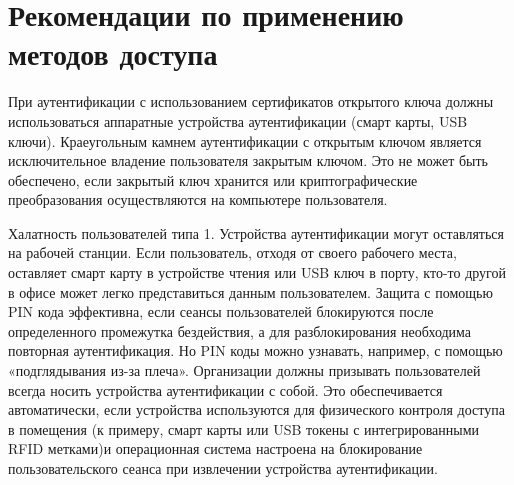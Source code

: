 \section{Рекомендации по применению методов доступа}

При аутентификации с использованием сертификатов открытого ключа должны
использоваться аппаратные устройства аутентификации (смарт карты, USB ключи).
Краеугольным камнем аутентификации с открытым ключом является исключительное
владение пользователя закрытым ключом. Это не может быть обеспечено, если
закрытый ключ хранится или криптографические преобразования осуществляются на
компьютере пользователя.

Халатность пользователей типа 1. Устройства аутентификации могут оставляться на
рабочей станции. Если пользователь, отходя от своего рабочего места, оставляет
смарт карту в устройстве чтения или USB ключ в порту, кто-то другой в офисе
может легко представиться данным пользователем. Защита с помощью PIN кода
эффективна, если сеансы пользователей блокируются после определенного промежутка
бездействия, а для разблокирования необходима повторная аутентификация. Но PIN
коды можно узнавать, например, с помощью «подглядывания из-за плеча».
Организации должны призывать пользователей всегда носить устройства
аутентификации с собой. Это обеспечивается автоматически, если устройства
используются для физического контроля доступа в помещения (к примеру, смарт
карты или USB токены с интегрированными RFID метками)и операционная система
настроена на блокирование пользовательского сеанса при извлечении устройства
аутентификации.

